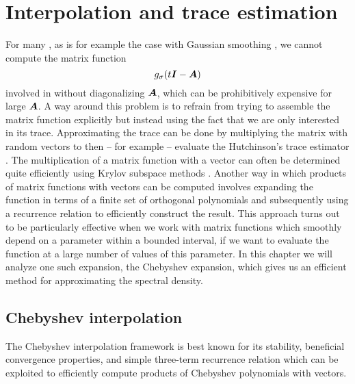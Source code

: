 \chapter{Interpolation and trace estimation}
\label{chp:2-chebyshev}

For many , as is for example the case with Gaussian smoothing
, we cannot compute the matrix function
\begin{equation}
    g_{\sigma}(t\boldsymbol{I} - \boldsymbol{A})
    \label{equ:2-chebyshev-matrix-function}
\end{equation}
involved in  without
diagonalizing $\boldsymbol{A}$, which can be prohibitively expensive for large
$\boldsymbol{A}$. A way around this problem is to refrain from trying to assemble the
matrix function explicitly but instead using the fact that we are only interested
in its trace. Approximating the trace can be done by multiplying the matrix
with random vectors to then -- for example -- evaluate the Hutchinson's trace estimator \cite{hutchinson1990trace}.
The multiplication of a matrix function with a vector can
often be determined quite efficiently using Krylov subspace methods
\cite[chapter~13.2]{higham2008functions}. Another way in which products of matrix
functions with vectors can be computed involves
expanding the function in terms of a finite set of orthogonal polynomials
and subsequently using a recurrence relation to efficiently construct the result.
This approach turns out to be particularly effective when we work with matrix
functions which smoothly depend on a parameter within a bounded interval, if we
want to evaluate the function at a large number of values of this parameter.
In this chapter we will analyze one such expansion, the Chebyshev expansion,
which gives us an efficient method for approximating the spectral density.


\section{Chebyshev interpolation}
\label{sec:2-chebyshev-interpolation}

The Chebyshev interpolation framework is best known for its stability, beneficial
convergence properties, and simple three-term recurrence relation
 which can
be exploited to efficiently compute products of Chebyshev polynomials with
vectors.\\

